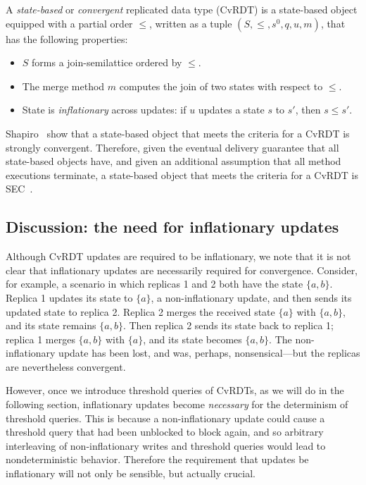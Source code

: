 A \emph{state-based} or \emph{convergent} replicated data type (CvRDT)
is a state-based object equipped with a partial order $\leq$, written
as a tuple
$(S, \leq, s^0, q, u, m)$, that has the following properties:
\begin{itemize}
\item $S$ forms a join-semilattice ordered by $\leq$.
\item The merge method $m$ computes the join of two
  states with respect to $\leq$.
\item State is \emph{inflationary} across updates: if $u$ updates a
  state $s$ to $s'$, then $s \leq s'$.
\end{itemize}
Shapiro \etal~show that a state-based object that meets the criteria
for a CvRDT is strongly convergent.  Therefore, given the eventual
delivery guarantee that all state-based objects have, and given an
additional assumption that all method executions terminate, a
state-based object that meets the criteria for a CvRDT is
SEC~\cite{crdts}.

\subsection{Discussion: the need for inflationary updates}

Although CvRDT updates are required to be inflationary, we note that
it is not clear that inflationary updates are necessarily required for
convergence.  Consider, for example, a scenario in which replicas 1
and 2 both have the state $\{a, b\}$. Replica 1 updates its state to
$\{a\}$, a non-inflationary update, and then sends its updated state
to replica 2.  Replica 2 merges the received state $\{a\}$ with $\{a,
b\}$, and its state remains $\{a, b\}$. Then replica 2 sends its state
back to replica 1; replica 1 merges $\{a, b\}$ with $\{a\}$, and its
state becomes $\{a, b\}$.  The non-inflationary update has been lost,
and was, perhaps, nonsensical---but the replicas are nevertheless
convergent.

However, once we introduce threshold queries of CvRDTs, as
we will do in the following section, inflationary updates become
\emph{necessary} for the determinism of threshold queries.  This is
because a non-inflationary update could cause a threshold query that
had been unblocked to block again, and so arbitrary interleaving of
non-inflationary writes and threshold queries would lead to
nondeterministic behavior.  Therefore the requirement that updates be
inflationary will not only be sensible, but actually crucial.

